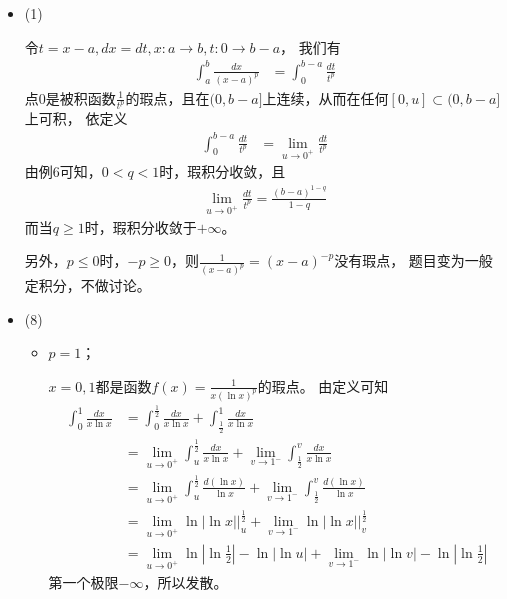 \documentclass{article}
\begin{document}
\begin{itemize}
  \item (1)

        令$t = x - a, dx = dt, x: a \to b, t: 0 \to b - a$，
        我们有
        \begin{align*}
          \int_{a}^{b} \frac{dx}{(x - a)^p}
           & = \int_{0}^{b - a} \frac{dt}{t^p}
        \end{align*}
        点$0$是被积函数$\frac{1}{t^p}$的瑕点，且在$(0, b-a]$上连续，从而在任何$[0, u] \subset (0, b-a]$上可积，
        依定义
        \begin{align*}
          \int_{0}^{b - a} \frac{dt}{t^p}
           & = \lim\limits_{u \to 0^{+}} \frac{dt}{t^p}
        \end{align*}
        由例6可知，$0 < q < 1$时，瑕积分收敛，且
        \begin{align*}
          \lim\limits_{u \to 0^{+}} \frac{dt}{t^p} = \frac{(b - a)^{1 - q}}{1-q}
        \end{align*}
        而当$q \geq 1$时，瑕积分收敛于$+\infty$。

        另外，$p \leq 0$时，$-p \geq 0$，则$\frac{1}{(x - a)^p} = (x - a)^{-p}$没有瑕点，
        题目变为一般定积分，不做讨论。

  \item (8)

        \begin{itemize}
          \item $p = 1$；

                $x = 0, 1$都是函数$f(x) = \frac{1}{x(\ln x)^p}$的瑕点。
                由定义可知
                \begin{align*}
                  \int_{0}^{1} \frac{dx}{x\ln x}
                   & = \int_{0}^{\frac{1}{2}} \frac{dx}{x\ln x} + \int_{\frac{1}{2}}^{1} \frac{dx}{x\ln x}                                                               \\
                   & = \lim\limits_{u \to 0^{+}} \int_{u}^{\frac{1}{2}} \frac{dx}{x\ln x} + \lim\limits_{v \to 1^{-}} \int_{\frac{1}{2}}^{v} \frac{dx}{x\ln x}           \\
                   & = \lim\limits_{u \to 0^{+}} \int_{u}^{\frac{1}{2}} \frac{d(\ln x)}{\ln x} + \lim\limits_{v \to 1^{-}} \int_{\frac{1}{2}}^{v} \frac{d(\ln x)}{\ln x} \\
                   & = \lim\limits_{u \to 0^{+}} \ln |\ln x| \bigg|_u^{\frac{1}{2}} + \lim\limits_{v \to 1^{-}} \ln |\ln x| \bigg|_v^{\frac{1}{2}}                       \\
                   & = \lim\limits_{u \to 0^{+}} \ln |\ln \frac{1}{2}| - \ln |\ln u| + \lim\limits_{v \to 1^{-}} \ln |\ln v| - \ln |\ln \frac{1}{2}|
                \end{align*}
                第一个极限$-\infty$，所以发散。


\end{itemize}
\end{itemize}
\end{document}

